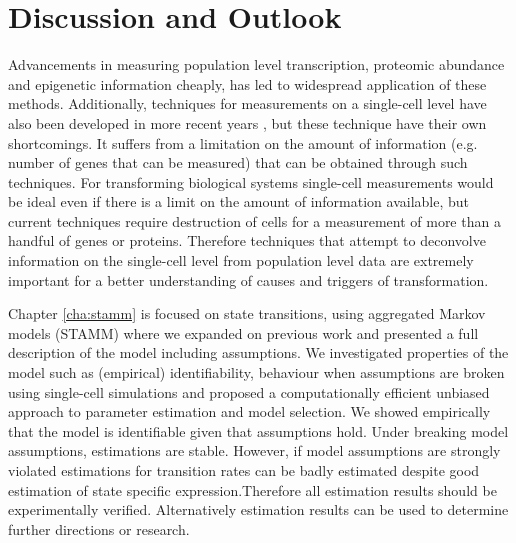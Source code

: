 
\chapter{Discussion and Outlook}
\label{cha:discussion-outlook}

Advancements in measuring population level transcription, proteomic abundance and epigenetic information cheaply, has led to widespread application of these methods. Additionally, techniques for measurements on a single-cell level have also been developed in more recent years \citep{Wheeler:2003ka, Dalerba:2011cc, Wang:2010ew}, but these technique have their own shortcomings. It suffers from a limitation on the amount of information (e.g. number of genes that can be measured) that can be obtained through such techniques. For transforming biological systems single-cell measurements would be ideal even if there is a limit on the amount of information available, but current techniques require destruction of cells for a measurement of more than a handful of genes or proteins. Therefore techniques that attempt to deconvolve information on the single-cell level from population level data are extremely important for a better understanding of causes and triggers of transformation.

Chapter \ref{cha:stamm} is focused on state transitions, using aggregated Markov models (STAMM) where we expanded on previous work \citep{Armond:2013} and presented a full description of the model including assumptions. We investigated properties of the model such as (empirical) identifiability, behaviour when assumptions are broken using single-cell simulations and proposed a computationally efficient unbiased approach to parameter estimation and model selection. We showed empirically that the model is identifiable given that assumptions hold. Under breaking model assumptions, estimations are stable. However, if model assumptions are strongly violated estimations for transition rates can be badly estimated despite good estimation of state specific expression.Therefore all estimation results should be experimentally verified. Alternatively estimation results can be used to determine further directions or research.

